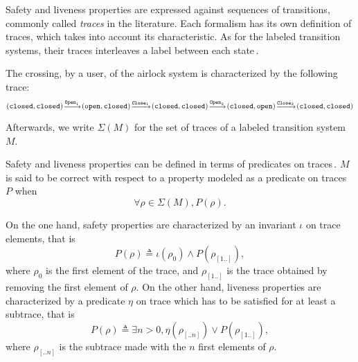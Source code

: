 Safety and liveness properties are expressed against sequences of transitions,
commonly called \emph{traces} in the literature.
%
Each formalism has its own definition of traces, which takes into account its
characteristic.
%
As for the labeled transition systems, their traces interleaves a label between
each state\,\cite{vijayaraghavan2015modular}.

\begin{example}
  The crossing, by a user, of the airlock system is characterized by the
  following trace:
  \[
    \footnotesize (\mathtt{closed}, \mathtt{closed})%
    \!\xrightarrow{\mathtt{Open}_1}\!(\mathtt{open}, \mathtt{closed})%
    \!\xrightarrow{\mathtt{Close}_1}\!(\mathtt{closed}, \mathtt{closed})%
    \!\xrightarrow{\mathtt{Open}_2}\!(\mathtt{closed}, \mathtt{open})%
    \!\xrightarrow{\mathtt{Close}_2}\!(\mathtt{closed}, \mathtt{closed})
  \]
\end{example}


Afterwards, we write \( \Sigma(M) \) for the set of traces of a labeled
transition system \( M \).

Safety and liveness properties can be defined in terms of predicates on
traces\,\cite{alpern1987recognizing,schneider2000enforceable,basin2013enforceable}.
%
\( M \) is said to be correct with respect to a property modeled as a predicate
on traces \( P \) when
%
\[
  \forall \rho \in \Sigma(M), P(\rho).
\]

On the one hand, safety properties are characterized by an invariant \( \iota \)
on trace elements, that is
%
\[
  P(\rho) \triangleq \iota(\rho_0) \wedge P(\rho_{[1..]}),
\]
%
where \( \rho_0 \) is the first element of the trace, and \( \rho_{[1..]} \) is
the trace obtained by removing the first element of \( \rho \).
%
On the other hand, liveness properties are characterized by a predicate
\( \eta \) on trace which has to be satisfied for at least a subtrace, that is
%
\[
  P(\rho) \triangleq \exists n > 0, \eta(\rho_{[..n]}) \vee P(\rho_{[1..]}),
\]
%
where \( \rho_{[..n]} \) is the subtrace made with the \( n \) first elements of
\( \rho \).

